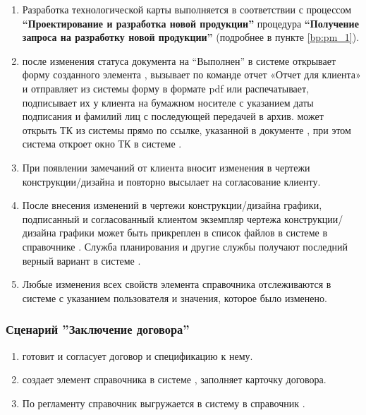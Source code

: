 \begin{enumerate}
\item 	Разработка технологической карты выполняется в соответствии с процессом \textbf{“Проектирование и разработка новой продукции”} процедура \textbf{“Получение запроса на разработку новой продукции”} (подробнее в пункте \ref{bp:pm_1}).
\item \manager	после изменения \tehnolog статуса  документа  на “Выполнен” в системе \gofro открывает форму созданного элемента , вызывает по команде  отчет «Отчет для клиента» и отправляет из системы \gofro форму в формате pdf или распечатывает, подписывает их у клиента на бумажном носителе с указанием даты подписания и фамилий лиц с последующей передачей в архив.
\manager может открыть ТК из системы \erp прямо по ссылке, указанной в документе , при этом система \erp откроет окно ТК в системе \gofro.
\item 	При появлении замечаний от клиента \tehnolog вносит изменения в чертежи конструкции/дизайна и \manager повторно высылает   на согласование клиенту.
\item 	После внесения изменений \tehnolog в чертежи конструкции/дизайна графики, подписанный и согласованный клиентом экземпляр чертежа конструкции/ дизайна графики может быть прикреплен в список файлов в системе \gofro в справочнике . Служба планирования и другие службы получают последний верный вариант  в системе \gofro.
\item 	Любые изменения всех свойств элемента справочника  отслеживаются в системе \gofro с указанием пользователя и значения, которое было изменено.


\end{enumerate}




\subsubsection{Сценарий ''Заключение договора''}
\label{bp:sales_4}

\begin{enumerate}
\item \manager готовит и согласует договор и спецификацию к нему.
\item \manager создает элемент справочника  в системе \erp, заполняет карточку договора.
\item	По регламенту справочник выгружается в систему \gofro в справочник .



\end{enumerate}


